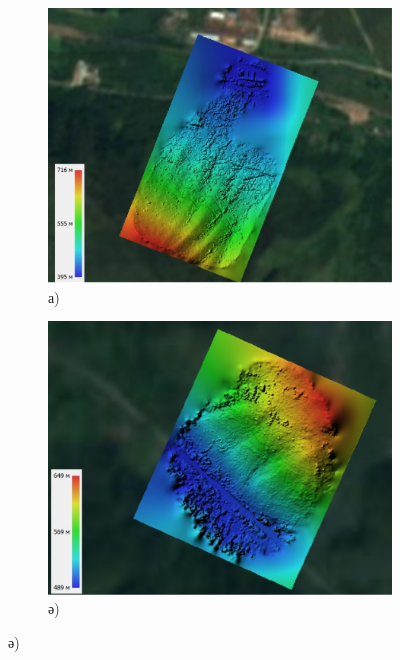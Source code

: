 \begin{figure}[H]
    \centering
    \begin{subfigure}[t]{0.45\textwidth}
        \centering
        \includegraphics[width=\textwidth]{media/ict2/image203}
        \caption*{а)}
    \end{subfigure}
    \begin{subfigure}[t]{0.45\textwidth}
        \centering
        \includegraphics[width=\textwidth]{media/ict2/image204}
        \caption*{ә)}
    \end{subfigure}
\end{figure}
